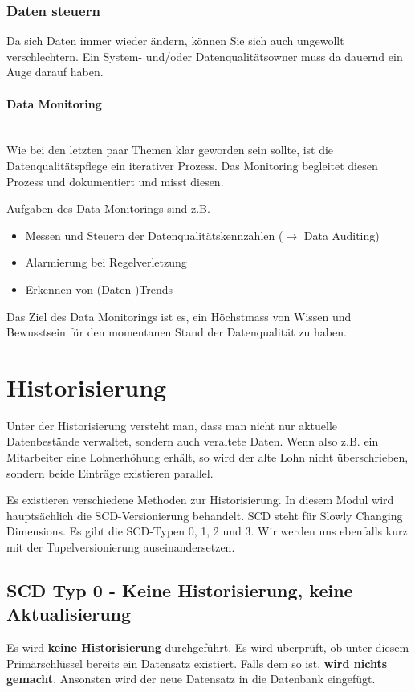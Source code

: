 \documentclass[a4paper, 11pt, nofootinbib]{article}
\begin{document}

\newpage

\subsubsection{Daten steuern}
Da sich Daten immer wieder ändern, können Sie sich auch ungewollt verschlechtern. Ein System- und/oder Datenqualitätsowner muss da dauernd ein Auge darauf haben.

\paragraph{Data Monitoring}\mbox{}\\
Wie bei den letzten paar Themen klar geworden sein sollte, ist die Datenqualitätspflege ein iterativer Prozess. Das Monitoring begleitet diesen Prozess und dokumentiert und misst diesen.

Aufgaben des Data Monitorings sind z.B. 
\begin{itemize}
	\item Messen und Steuern der Datenqualitätskennzahlen ($\rightarrow$ Data Auditing)
	\item Alarmierung bei Regelverletzung
	\item Erkennen von (Daten-)Trends
\end{itemize}

Das Ziel des Data Monitorings ist es, ein Höchstmass von Wissen und Bewusstsein für den momentanen Stand der Datenqualität zu haben.

\newpage

\section{Historisierung}
Unter der Historisierung versteht man, dass man nicht nur aktuelle Datenbestände verwaltet, sondern auch veraltete Daten. Wenn also z.B. ein Mitarbeiter eine Lohnerhöhung erhält, so wird der alte Lohn nicht überschrieben, sondern beide Einträge existieren parallel.

Es existieren verschiedene Methoden zur Historisierung. In diesem Modul wird hauptsächlich die SCD-Versionierung behandelt. SCD steht für Slowly Changing Dimensions. Es gibt die SCD-Typen 0, 1, 2 und 3. Wir werden uns ebenfalls kurz mit der Tupelversionierung auseinandersetzen.

\subsection{SCD Typ 0 - Keine Historisierung, keine Aktualisierung}
Es wird \textbf{keine Historisierung} durchgeführt. Es wird überprüft, ob unter diesem Primärschlüssel bereits ein Datensatz existiert. Falls dem so ist, \textbf{wird nichts gemacht}. Ansonsten wird der neue Datensatz in die Datenbank eingefügt.
\end{document}
